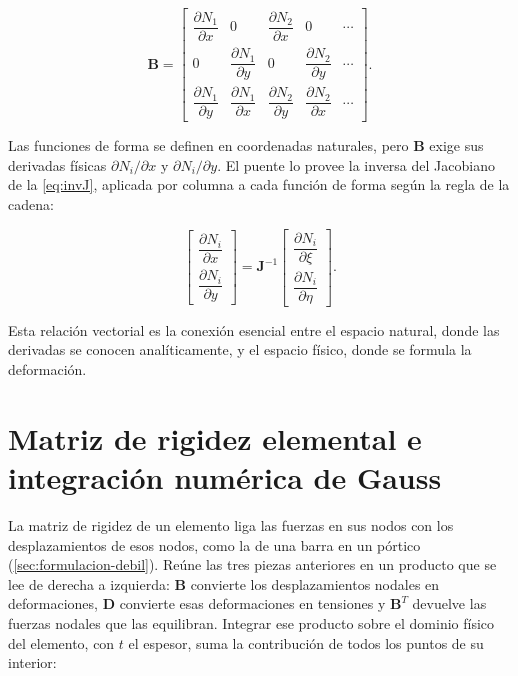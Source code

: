 \begin{equation}
\bm{B} =
\begin{bmatrix}
\dfrac{\partial N_1}{\partial x} & 0 & \dfrac{\partial N_2}{\partial x} & 0 & \cdots \\[6pt]
0 & \dfrac{\partial N_1}{\partial y} & 0 & \dfrac{\partial N_2}{\partial y} & \cdots \\[6pt]
\dfrac{\partial N_1}{\partial y} & \dfrac{\partial N_1}{\partial x} & \dfrac{\partial N_2}{\partial y} & \dfrac{\partial N_2}{\partial x} & \cdots
\end{bmatrix}.
\label{eq:matriz-B}
\end{equation}

Las funciones de forma se definen en coordenadas naturales, pero $\bm{B}$ exige sus derivadas físicas $\partial N_i/\partial x$ y $\partial N_i/\partial y$. El puente lo provee la inversa del Jacobiano de la \autoref{eq:invJ}, aplicada por columna a cada función de forma según la regla de la cadena:

\begin{equation}
\begin{bmatrix}
\dfrac{\partial N_i}{\partial x} \\[6pt]
\dfrac{\partial N_i}{\partial y}
\end{bmatrix}
= \bm{J}^{-1}
\begin{bmatrix}
\dfrac{\partial N_i}{\partial \xi} \\[6pt]
\dfrac{\partial N_i}{\partial \eta}
\end{bmatrix}.
\label{eq:fisica-natural}
\end{equation}

Esta relación vectorial es la conexión esencial entre el espacio natural, donde las derivadas se conocen analíticamente, y el espacio físico, donde se formula la deformación.

\section{Matriz de rigidez elemental e integración numérica de Gauss}
\label{sec:rigidez-gauss}

La matriz de rigidez de un elemento liga las fuerzas en sus nodos con los desplazamientos de esos nodos, como la de una barra en un pórtico (\autoref{sec:formulacion-debil}). Reúne las tres piezas anteriores en un producto que se lee de derecha a izquierda: $\bm{B}$ convierte los desplazamientos nodales en deformaciones, $\bm{D}$ convierte esas deformaciones en tensiones y $\bm{B}^T$ devuelve las fuerzas nodales que las equilibran. Integrar ese producto sobre el dominio físico del elemento, con $t$ el espesor, suma la contribución de todos los puntos de su interior:

